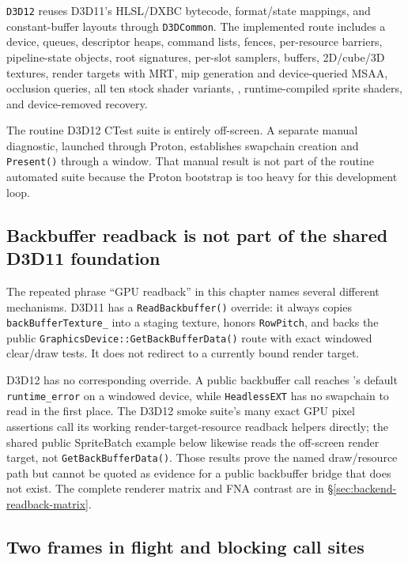 \texttt{D3D12} reuses D3D11's HLSL/DXBC bytecode, format/state mappings, and constant-buffer
layouts through \texttt{D3DCommon}. The implemented route includes a device, queues, descriptor
heaps, command lists, fences, per-resource barriers, pipeline-state objects, root signatures,
per-slot samplers, buffers, 2D/cube/3D textures, render targets with MRT, mip generation and
device-queried MSAA, occlusion queries, all ten stock shader variants, ,
runtime-compiled sprite shaders, and device-removed recovery.

\begin{evidencenote}
The routine D3D12 CTest suite is entirely off-screen. A separate manual diagnostic, launched
through Proton, establishes swapchain creation and \texttt{Present()} through a window. That
manual result is not part of the routine automated suite because the Proton bootstrap is too
heavy for this development loop.
\end{evidencenote}

\subsection{Backbuffer readback is not part of the shared D3D11 foundation}

The repeated phrase ``GPU readback'' in this chapter names several different mechanisms.
D3D11 has a \texttt{ReadBackbuffer()} override: it always copies
\texttt{backBufferTexture\_} into a staging texture, honors \texttt{RowPitch}, and backs the
public \texttt{GraphicsDevice::GetBackBuffer\allowbreak Data()} route with exact windowed
clear/draw
tests. It does not redirect to a currently bound render target.

D3D12 has no corresponding override. A public backbuffer call reaches
's default \texttt{runtime\_error} on a windowed device, while
\texttt{HeadlessEXT} has no swapchain to read in the first place. The D3D12 smoke suite's many
exact GPU pixel assertions call its working render-target-resource readback helpers directly;
the shared public SpriteBatch example below likewise reads the off-screen render target, not
\texttt{GetBackBufferData()}. Those results prove the named draw/resource path but cannot be
quoted as evidence for a public backbuffer bridge that does not exist. The complete renderer
matrix and FNA contrast are in \S\ref{sec:backend-readback-matrix}.

\subsection{Two frames in flight and blocking call sites}


